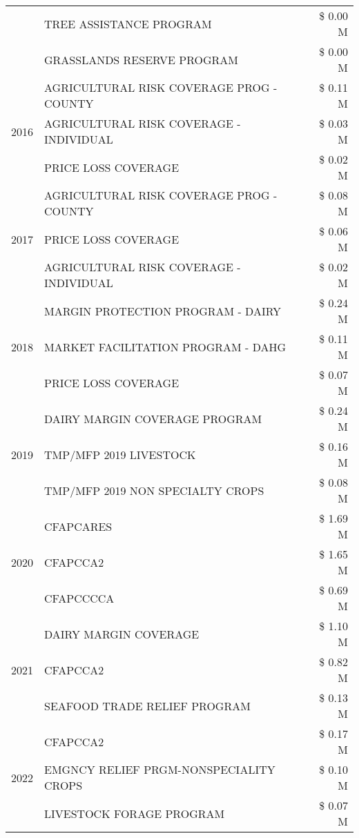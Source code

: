 \begin{tabular}{llr}
 & TREE ASSISTANCE PROGRAM & \$ 0.00 M \\
 & GRASSLANDS RESERVE PROGRAM & \$ 0.00 M \\
\cline{1-3}
\multirow[t]{3}{*}{2016} & AGRICULTURAL RISK COVERAGE PROG - COUNTY & \$ 0.11 M \\
 & AGRICULTURAL RISK COVERAGE - INDIVIDUAL & \$ 0.03 M \\
 & PRICE LOSS COVERAGE & \$ 0.02 M \\
\cline{1-3}
\multirow[t]{3}{*}{2017} & AGRICULTURAL RISK COVERAGE PROG - COUNTY & \$ 0.08 M \\
 & PRICE LOSS COVERAGE & \$ 0.06 M \\
 & AGRICULTURAL RISK COVERAGE - INDIVIDUAL & \$ 0.02 M \\
\cline{1-3}
\multirow[t]{3}{*}{2018} & MARGIN PROTECTION PROGRAM - DAIRY & \$ 0.24 M \\
 & MARKET FACILITATION PROGRAM - DAHG & \$ 0.11 M \\
 & PRICE LOSS COVERAGE & \$ 0.07 M \\
\cline{1-3}
\multirow[t]{3}{*}{2019} & DAIRY MARGIN COVERAGE PROGRAM & \$ 0.24 M \\
 & TMP/MFP 2019 LIVESTOCK & \$ 0.16 M \\
 & TMP/MFP 2019 NON SPECIALTY CROPS & \$ 0.08 M \\
\cline{1-3}
\multirow[t]{3}{*}{2020} & CFAPCARES & \$ 1.69 M \\
 & CFAPCCA2 & \$ 1.65 M \\
 & CFAPCCCCA & \$ 0.69 M \\
\cline{1-3}
\multirow[t]{3}{*}{2021} & DAIRY MARGIN COVERAGE & \$ 1.10 M \\
 & CFAPCCA2 & \$ 0.82 M \\
 & SEAFOOD TRADE RELIEF PROGRAM & \$ 0.13 M \\
\cline{1-3}
\multirow[t]{3}{*}{2022} & CFAPCCA2 & \$ 0.17 M \\
 & EMGNCY RELIEF PRGM-NONSPECIALITY CROPS & \$ 0.10 M \\
 & LIVESTOCK FORAGE PROGRAM & \$ 0.07 M \\
\cline{1-3}
\bottomrule
\end{tabular}
